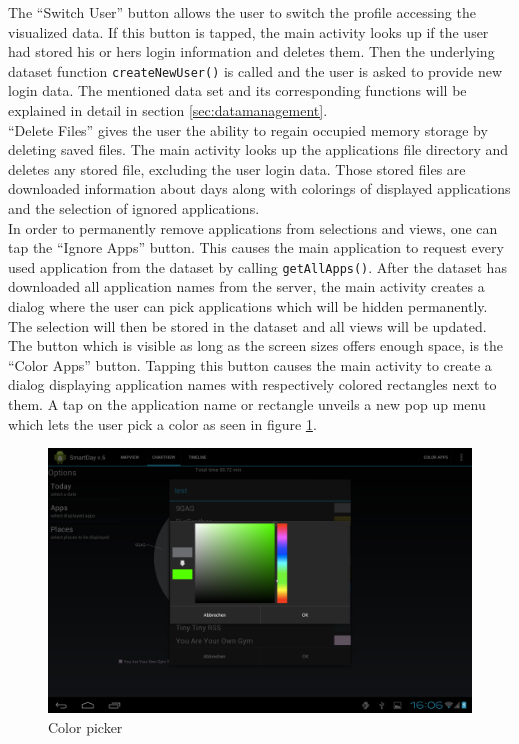 The  ``Switch User'' button allows the user to switch the profile accessing the visualized data. If this button is tapped, the main activity looks up if the user had stored his or hers login information and deletes them. Then the underlying dataset function \lstinline$createNewUser()$ is called and the user is asked to provide new login data. The mentioned data set and its corresponding functions will be explained in detail in section \ref{sec:datamanagement}.\\
``Delete Files''  gives the user the ability to regain occupied memory storage by deleting saved files. The main activity looks up the applications file directory and deletes any stored file, excluding the user login data. Those stored files are downloaded information about days along with colorings of displayed applications and the selection of ignored applications.\\
In  order to permanently remove applications from selections and views, one can tap the ``Ignore Apps'' button. This causes the main application to request every used application from the dataset by calling \lstinline$getAllApps()$. After the dataset has downloaded all application names from the server, the main activity creates a dialog where the user can pick applications which will be hidden permanently. The selection will then be stored in the dataset and all views will be updated.\\
The  button which is visible as long as the screen sizes offers enough space, is the ``Color Apps'' button. Tapping this button causes the main activity to create a dialog displaying application names with respectively colored rectangles next to them. A tap on the application name or rectangle unveils a new pop up menu which lets the user pick a color as seen in figure \ref{img:colorpicker}.
\begin{figure}[h]
	\caption{Color picker}
	\label{img:colorpicker}
	\includegraphics[width=\textwidth]{images/Screenshots/v6/Screenshot_2013-08-19-16-06-13.png}
\end{figure}

